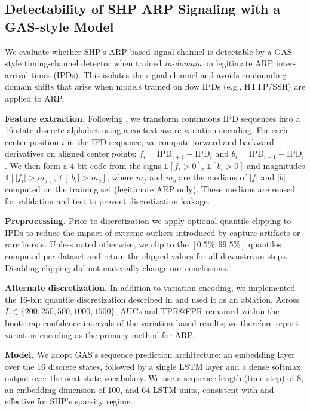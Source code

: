 \subsection{Detectability of SHP ARP Signaling with a GAS-style Model}
\label{sec:shp-gas-arp}

We evaluate whether \ac{SHP}'s ARP-based signal channel is detectable by a GAS-style timing-channel detector when trained \emph{in-domain} on legitimate ARP inter-arrival times (IPDs). This isolates the signal channel and avoids confounding domain shifts that arise when models trained on flow IPDs (e.g., HTTP/SSH) are applied to ARP.

\textbf{Feature extraction.} Following \cite{li2022GAS}, we transform continuous IPD sequences into a 16-state discrete alphabet using a context-aware variation encoding. For each center position $i$ in the IPD sequence, we compute forward and backward derivatives on aligned center points: $f_i = \mathrm{IPD}_{i+1} - \mathrm{IPD}_{i}$ and $b_i = \mathrm{IPD}_{i-1} - \mathrm{IPD}_{i}$. We then form a 4-bit code from the signs $\mathbb{1}[f_i > 0]$, $\mathbb{1}[b_i > 0]$ and magnitudes $\mathbb{1}[|f_i| > m_f]$, $\mathbb{1}[|b_i| > m_b]$, where $m_f$ and $m_b$ are the medians of $|f|$ and $|b|$ computed on the training set (legitimate ARP only). These medians are reused for validation and test to prevent discretization leakage.

\textbf{Preprocessing.} Prior to discretization we apply optional quantile clipping to IPDs to reduce the impact of extreme outliers introduced by capture artifacts or rare bursts. Unless noted otherwise, we clip to the $[0.5\%, 99.5\%]$ quantiles computed per dataset and retain the clipped values for all downstream steps. Disabling clipping did not materially change our conclusions.

\textbf{Alternate discretization.} In addition to variation encoding, we implemented the 16-bin quantile discretization described in \cite{li2022GAS} and used it as an ablation. Across $L \in \{200, 250, 500, 1000, 1500\}$, AUCs and TPR@FPR remained within the bootstrap confidence intervals of the variation-based results; we therefore report variation encoding as the primary method for ARP.

\textbf{Model.} We adopt GAS's sequence prediction architecture: an embedding layer over the 16 discrete states, followed by a single LSTM layer and a dense softmax output over the next-state vocabulary. We use a sequence length (time step) of 8, an embedding dimension of 100, and 64 LSTM units, consistent with \cite{li2022GAS} and effective for SHP's sparsity regime.

